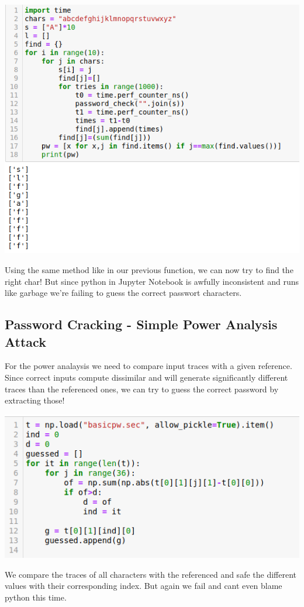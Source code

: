 \documentclass[a4paper,10pt]{article}
\begin{document}
\begin{center}
 \includegraphics[scale=0.5]{pw.png}
\end{center}
Using the same method like in our previous function, we can now try to find the right char! But since python in Jupyter Notebook is awfully inconsistent and runs like garbage we're failing to guess the correct passwort characters.
\newpage
\subsection{Password Cracking - Simple Power Analysis Attack}
For the power analaysis we need to compare input traces with a given reference. Since  correct inputs compute dissimilar and will generate significantly different traces than   the referenced ones, we can try to guess the correct password by extracting those!
\begin{center}
\includegraphics[scale=0.5]{3.4.png}
\end{center}
We compare the traces of all characters with the referenced and safe the different values with their corresponding index. But again we fail and cant even blame python this time.
\end{document}
